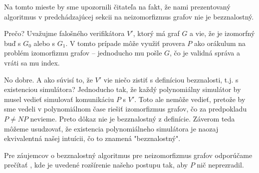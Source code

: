 \begin{poznamka}
    Na tomto mieste by sme upozornili čitateľa na fakt, že nami
    prezentovaný algoritmus v predchádzajúcej sekcii na neizomorfizmus grafov
    nie je bezznalostný.
    
    Prečo? Uvažujme falošného verifikátora $V'$,
    ktorý má graf $G$ a vie, že je izomorfný buď s $G_0$ alebo s
    $G_1$. V tomto prípade môže využiť provera $P$ ako orákulum na
    problém izomorfizmu grafov -- jednoducho mu pošle $G$, čo je
    validná správa a vráti sa mu index.

    No dobre. A ako súvisí to, že $V'$ vie niečo zistiť s definíciou
    bezznalosti, t.j. s existenciou simulátora? Jednoducho tak, že
    každý polynomiálny simulátor by musel vedieť simulovať komunikáciu
    $P$ s $V'$. Toto ale nemôže vedieť, pretože by sme vedeli v
    polynomiálnom čase riešiť izomorfizmus grafov, čo za predpokladu
    $P\neq NP$ nevieme. Preto dôkaz nie je bezznalostný z definície.
    Záverom teda môžeme usudzovať, že existencia polynomiálneho
    simulátora je naozaj ekvivalentná našej intuícii, čo to znamená
    "bezznalostný".

    Pre záujemcov o bezznalostný algoritmus pre neizomorfizmus grafov
    odporúčame prečítať \cite{nig}, kde je uvedené rozšírenie našeho
    postupu tak, aby $P$ nič neprezradil.
\end{poznamka}
